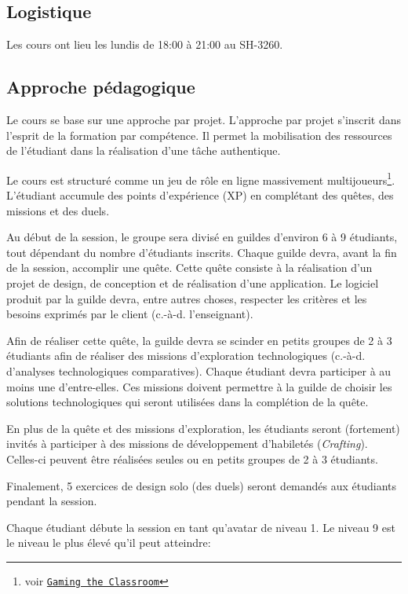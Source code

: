 \documentclass{article}
\newcommand{\ie} {c.-à-d. }
\begin{document}
\subsection{Logistique}
\label{sub:logistique}

Les cours ont lieu les lundis de 18:00 à 21:00 au SH-3260.%

\subsection{Approche pédagogique}
\label{sub:approche_pedagogique}

Le cours se base sur une approche par projet. L'approche par projet s'inscrit dans l'esprit de la formation par compétence. Il permet la mobilisation des ressources de l'étudiant dans la réalisation d'une tâche authentique.

Le cours est structuré comme un jeu de rôle en ligne massivement multijoueurs\footnote{voir \href{http://gamingtheclassroom.wordpress.com/}{\texttt{Gaming the Classroom}}}. L'étudiant accumule des points d'expérience (XP) en complétant des quêtes, des missions et des duels.

Au début de la session, le groupe sera divisé en guildes d'environ 6 à 9 étudiants, tout dépendant du nombre d'étudiants inscrits. Chaque guilde devra, avant la fin de la session, accomplir une quête. Cette quête consiste à la réalisation d'un projet de design, de conception et de réalisation d'une application. Le logiciel produit par la guilde devra, entre autres choses, respecter les critères et les besoins exprimés par le client (\ie l'enseignant).

Afin de réaliser cette quête, la guilde devra se scinder en petits groupes de 2 à 3 étudiants afin de réaliser des missions d'exploration technologiques (\ie d'analyses technologiques comparatives). Chaque étudiant devra participer à au moins une d'entre-elles. Ces missions doivent permettre à la guilde de choisir les solutions technologiques qui seront utilisées dans la complétion de la quête.

En plus de la quête et des missions d'exploration, les étudiants seront (fortement) invités à participer à des missions de développement d'habiletés (\emph{Crafting}). Celles-ci peuvent être réalisées seules ou en petits groupes de 2 à 3 étudiants.

Finalement, 5 exercices de design solo (des duels) seront demandés aux étudiants pendant la session.

Chaque étudiant débute la session en tant qu'avatar de niveau 1. Le niveau 9 est le niveau le plus élevé qu'il peut atteindre:
\end{document}

